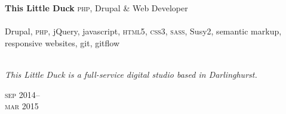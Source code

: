 
\begin{minipage}[t]{0.70\textwidth}
\textbf{This Little Duck}\phantom{..} \textsc{php}, Drupal \& Web Developer \\
\\
Drupal, \textsc{php}, jQuery, javascript, \textsc{html5}, 
\textsc{css3}, \textsc{sass}, Susy2, semantic markup, responsive websites,
git, gitflow
\\
\\
{\small
\textit{This Little Duck is a full-service digital studio based in Darlinghurst.}
\par}
\end{minipage}
\begin{minipage}[t]{0.30\textwidth}
{
\hfill \textsc{sep} 2014--\\ 
\hspace*{0pt} \hfill \textsc{mar} 2015
\par
}
\end{minipage}
\\
\\


